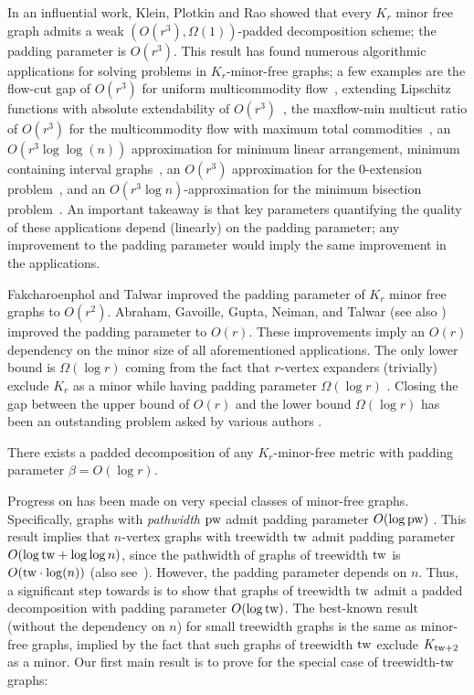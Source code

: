 \documentclass{article}
\newcommand{\tw}{{\rm tw}}
\newcommand{\pw}{{\rm pw}}
\begin{document}
In an influential work, Klein, Plotkin and Rao \cite{KPR93} showed that every $K_r$ minor free graph admits a weak $\left(O(r^3),\Omega(1)\right)$-padded decomposition scheme; the padding parameter is $O(r^3)$.  This result has found numerous algorithmic applications for solving problems in $K_r$-minor-free graphs; a few examples are the flow-cut gap of $O(r^3)$ for uniform multicommodity flow~\cite{KPR93}, extending Lipschitz functions with absolute extendability of $O(r^3)$~\cite{LN05},  the maxflow-min multicut ratio of $O(r^3)$ for the multicommodity flow with maximum total commodities~\cite{TV93}, an $O(r^3 \log\log(n))$ approximation for minimum linear arrangement,  minimum containing interval graphs~\cite{RR05}, an $O(r^3)$ approximation for the 0-extension problem~\cite{CKR04}, and an $O(r^3\log n)$-approximation for the minimum bisection problem~\cite{FK02}. An important takeaway is that key parameters quantifying the quality of these applications depend (linearly) on the padding parameter; any improvement to the padding parameter would imply the same improvement in the applications. 

Fakcharoenphol and Talwar \cite{FT03} improved the padding parameter of $K_r$ minor free graphs to $O(r^2)$.  Abraham, Gavoille, Gupta, Neiman, and Talwar \cite{AGGNT19} (see also \cite{Fil19Approx}) improved the padding parameter to $O(r)$. These improvements imply an $O(r)$ dependency on the minor size of all aforementioned applications. The only lower bound is $\Omega(\log r)$ coming from the fact that $r$-vertex expanders (trivially) exclude $K_r$ as a minor while having padding parameter $\Omega(\log r)$ \cite{Bar96}. Closing the gap between the upper bound of $O(r)$ and the lower bound $\Omega(\log r)$ has been an outstanding problem asked by various authors \cite{FT03,Lee12,AGGNT19,Fil19Approx}.

\begin{conjecture}\label{conj:Lee} There exists a padded decomposition of any $K_r$-minor-free metric with padding parameter $\beta = O(\log r)$.
\end{conjecture}

Progress on  has been made on very special classes of minor-free graphs. Specifically, graphs with \emph{pathwidth} $\pw$ admit padding parameter $O(\log\pw)$ \cite{AGGNT19}. This result implies that $n$-vertex graphs with treewidth $\tw$ admit padding parameter $O(\log\tw+\log\log n)$, since the pathwidth of graphs of treewidth $\tw$ is $O(\tw\cdot \log(n))$ (also see~\cite{KK17}). However, the padding parameter depends on $n$. Thus, a significant step towards  is to show that graphs of treewidth $\tw$ admit a padded decomposition with padding parameter $O(\log\tw)$. The best-known result (without the dependency on $n$) for small treewidth graphs is the same as minor-free graphs, implied by the fact that such graphs of treewidth $\tw$ exclude $K_{\tw+2}$ as a minor.  Our first main result is to prove  for the special case of treewidth-$\tw$ graphs:
\end{document}
